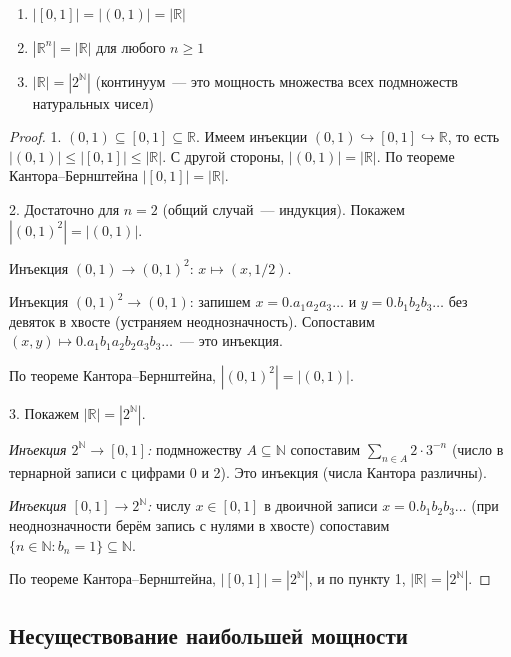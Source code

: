 \documentclass[12pt]{article}
\begin{document}
	\begin{theorem}
		\begin{enumerate}
			\item $|[0,1]| = |(0,1)| = |\mathbb{R}|$
			\item $|\mathbb{R}^n| = |\mathbb{R}|$ для любого $n \geqslant 1$
			\item $|\mathbb{R}| = |2^{\mathbb{N}}|$ (континуум~--- это мощность множества всех подмножеств натуральных чисел)
		\end{enumerate}
	\end{theorem}
	
	\begin{proof}
		1. $(0,1) \subseteq [0,1] \subseteq \mathbb{R}$. Имеем инъекции $(0,1) \hookrightarrow [0,1] \hookrightarrow \mathbb{R}$, то есть $|(0,1)| \leqslant |[0,1]| \leqslant |\mathbb{R}|$. С другой стороны, $|(0,1)| = |\mathbb{R}|$. По теореме Кантора--Бернштейна $|[0,1]| = |\mathbb{R}|$.
		
		2. Достаточно для $n = 2$ (общий случай~--- индукция). Покажем $|(0,1)^2| = |(0,1)|$.
		
		Инъекция $(0,1) \to (0,1)^2$: $x \mapsto (x, 1/2)$.
		
		Инъекция $(0,1)^2 \to (0,1)$: запишем $x = 0.a_1a_2a_3\dots$ и $y = 0.b_1b_2b_3\dots$ без девяток в хвосте (устраняем неоднозначность). Сопоставим $(x, y) \mapsto 0.a_1b_1a_2b_2a_3b_3\dots$~--- это инъекция.
		
		По теореме Кантора--Бернштейна, $|(0,1)^2| = |(0,1)|$.
		
		3. Покажем $|\mathbb{R}| = |2^\mathbb{N}|$.
		
		\textit{Инъекция $2^\mathbb{N} \to [0,1]$:} подмножеству $A \subseteq \mathbb{N}$ сопоставим $\sum_{n \in A} 2 \cdot 3^{-n}$ (число в тернарной записи с цифрами 0 и 2). Это инъекция (числа Кантора различны).
		
		\textit{Инъекция $[0,1] \to 2^\mathbb{N}$:} числу $x \in [0,1]$ в двоичной записи $x = 0.b_1b_2b_3\dots$ (при неоднозначности берём запись с нулями в хвосте) сопоставим $\{n \in \mathbb{N} : b_n = 1\} \subseteq \mathbb{N}$.
		
		По теореме Кантора--Бернштейна, $|[0,1]| = |2^\mathbb{N}|$, и по пункту 1, $|\mathbb{R}| = |2^\mathbb{N}|$.
	\end{proof}
	
	\subsection{Несуществование наибольшей мощности}
	
\end{document}
